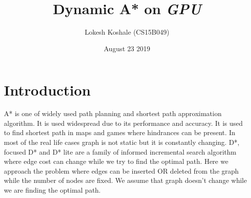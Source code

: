 \documentclass[a4paper]{article}
\title{Dynamic A* on \emph{GPU}}
\author{\normalsize Lokesh Koshale (CS15B049) \\\normalsize}
\date{\color{black}August 23 2019}
\begin{document}
 \maketitle





\section{Introduction}
A*\cite{A*}\cite{Wiki A*} is one of widely used path planning and shortest path approximation algorithm. It is used widespread due to its performance and accuracy. It is used to find shortest path in maps and games where hindrances can be present. In most of the real life cases graph is not static but it is constantly changing. D*\cite{original D*}, focused D*\cite{focused D*} and D* lite\cite{D* Lite} are a family of informed incremental search algorithm where edge cost can change while we try to find the optimal path. Here we approach the problem where edges can be inserted OR deleted from the graph while the number of nodes are fixed. We assume that graph doesn't change while we are finding the optimal path.\\
\end{document}

